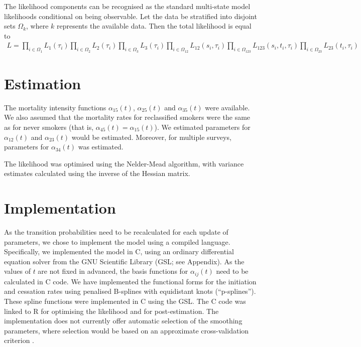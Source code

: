 \documentclass[11pt,a4paper]{article}
\begin{document}
The likelihood components can be recognised as the standard
multi-state model likelihoods conditional on being observable.  Let the data
be stratified into disjoint sets $\Omega_k$, where $k$ represents the
available data. Then the total likelihood is equal to
\begin{align*}
  L = 
\prod_{i \in \Omega_1} L_1(\tau_i)  
\prod_{i \in \Omega_2} L_2(\tau_i)  
\prod_{i \in \Omega_3} L_3(\tau_i)  
\prod_{i \in \Omega_{12}} L_{12}(s_i,\tau_i)  
\prod_{i \in \Omega_{123}} L_{123}(s_i,t_i,\tau_i)  
\prod_{i \in \Omega_{23}} L_{23}(t_i,\tau_i)  
\end{align*}


\section{Estimation}

The mortality intensity functions $\alpha_{15}(t)$, $\alpha_{25}(t)$
and $\alpha_{35}(t)$ were available. We also assumed that the
mortality rates for reclassified smokers were the same as for never
smokers (that is, $\alpha_{45}(t)=\alpha_{15}(t)$). We estimated
parameters for $\alpha_{12}(t)$ and $\alpha_{23}(t)$ would be
estimated. Moreover, for multiple surveys, parameters for
$\alpha_{34}(t)$ was estimated.

The likelihood was optimised using the Nelder-Mead algorithm, with variance estimates calculated using the inverse of the Hessian matrix.



\section{Implementation}

As the transition probabilities need to be recalculated for each
update of parameters, we chose to implement the model using a compiled
language. Specifically, we implemented the model in C, using an
ordinary differential equation solver from the GNU Scientific Library
(GSL; see Appendix). As the values of $t$ are not fixed in advanced,
the basis functions for $\alpha_{ij}(t)$ need to be calculated in C
code.  We have implemented the functional forms for the initiation and
cessation rates using penalised B-splines with equidistant knots
(``p-splines''). These spline functions were implemented in C using
the GSL.  The C code was linked to R for optimising the likelihood and
for post-estimation.  The implementation does not currently offer
automatic selection of the smoothing parameters, where selection would
be based on an approximate cross-validation criterion
\cite[e.g.][]{joly_penalized_2002,cai_hazard_2003}.
\end{document}
